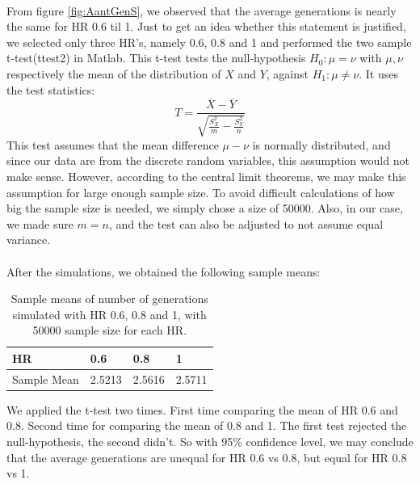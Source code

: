 \\
From figure \ref{fig:AantGenS}, we observed that the average generations is nearly the same for HR 0.6 til 1. Just to get an idea whether this statement is justified, we selected only three HR's, namely 0.6, 0.8 and 1 and performed the two sample t-test(ttest2) in Matlab. This t-test tests the null-hypothesis $H_0:\mu=\nu$ with $\mu,\nu$ respectively the mean of the distribution of $X$ and $Y$, against $H_1:\mu\neq\nu$. It uses the test statistics:
 \[T=\frac{\overline{X}-\overline{Y}}{\sqrt{\frac{S^2_X}{m}-\frac{S^2_Y}{n}}}\]
This test assumes that the mean difference $\mu-\nu$ is normally distributed, and since our data are from the discrete random variables, this assumption would not make sense. However, according to the central limit theorems, we may make this assumption for large enough sample size. To avoid difficult calculations of how big the sample size is needed, we simply chose a size of 50000. Also, in our case, we made sure $m=n$, and the test can also be adjusted to not assume equal variance.\\
\\
After the simulations, we obtained the following sample means:
\begin{table}[htp]
\centering
\caption{Sample means of number of generations simulated with HR 0.6, 0.8 and 1, with 50000 sample size for each HR.}
\begin{tabular}{|l|l|l|l|}
\hline
 HR&0.6&0.8&1 \\ \hline
 Sample Mean&2.5213&2.5616&2.5711  \\ \hline 
\end{tabular}
\end{table}
We applied the t-test two times. First time comparing the mean of HR 0.6 and 0.8. Second time for comparing the mean of 0.8 and 1. The first test rejected the null-hypothesis, the second didn't. So with 95\% confidence level, we may conclude that the average generations are unequal for HR 0.6 vs 0.8, but equal for HR 0.8 vs 1.